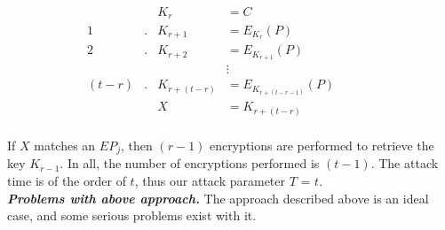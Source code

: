 \begin{align*}
& & K_r &= C & & & &\\
1&. &K_{r+1} &= E_{K_r}(P)  & & & &\\
2&. &K_{r+2} &= E_{K_{r+1}}(P) & & & &\\
& & &\vdots & & & &\\
(t-r) &. &K_{r + (t-r)} &= E_{K_{r + (t-r-1)}}(P) & & & &\\
& & X &= K_{r + (t - r)} & & & &\\
\end{align*}

If $X$ matches an $EP_j$, then $(r-1)$ encryptions are performed to retrieve the key $K_{r-1}$. In all, the number of encryptions performed is $(t-1)$. The attack time is of the order of $t$, thus our attack parameter $T$ = $t$. \\

\noindent  \textit{\textbf{Problems with above approach.}} The approach described above is an ideal case, and some serious problems exist with it.

